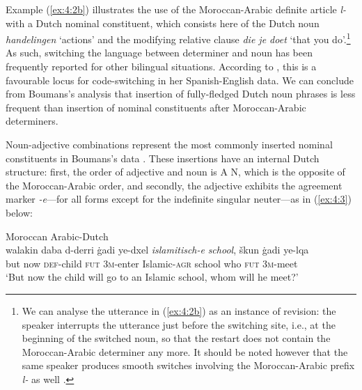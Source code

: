 \noindent Example (\ref{ex:4:2b}) illustrates the use of the Moroccan-Arabic definite article \textit{l-} with a Dutch nominal constituent, which consists here of the Dutch noun \textit{handelingen} `actions' and the modifying relative clause \textit{die je doet} `that you do'.\footnote{We can analyse the utterance in (\ref{ex:4:2b}) as an instance of revision: the speaker interrupts the utterance just before the switching site, i.e., at the beginning of the switched noun, so that the restart does not contain the Moroccan-Arabic determiner any more. It should be noted however that the same speaker produces smooth switches involving the Moroccan-Arabic prefix \textit{l-} as well \citep[cf.][185]{boumans-syntax-1998}.} As such, switching the language between determiner and noun has been frequently reported for other bilingual situations. According to \citet[604]{poplack-sometimes-1980}, this is a favourable locus for code-switching in her Spanish-English data. We can conclude from Boumans's analysis that insertion of fully-fledged Dutch noun phrases is less frequent than insertion of nominal constituents after Moroccan-Arabic determiners.

Noun-adjective combinations represent the most commonly inserted nominal constituents in Boumans's data \citep[cf.][203--205]{boumans-syntax-1998}. These insertions have an internal Dutch structure: first, the order of adjective and noun is A N, which is the opposite of the Moroccan-Arabic order, and secondly, the adjective exhibits the agreement marker \textit{-e}---for all forms except for the indefinite singular neuter---as in (\ref{ex:4:3}) below: 

\ea
\label{ex:4:3}
Moroccan Arabic-Dutch \citep[204]{boumans-syntax-1998}\\
\gll walakin daba d-derri ġadi ye-dxel \textit{islamitisch-e} \textit{school}, škun ġadi ye-lqa\\
	but now \textsc{def}-child \textsc{fut} \textsc{3m}-enter Islamic-\textsc{agr} school who \textsc{fut} \textsc{3m}-meet\\
\glt `But now the child will go to an Islamic school, whom will he meet?'
\z

